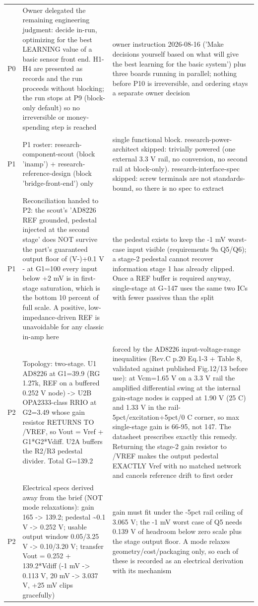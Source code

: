 \documentclass[11pt,a4paper]{article}
\begin{document}
{\begin{longtable}{lp{5.2cm}p{7.2cm}}
P0 & Owner delegated the remaining engineering judgment: decide in-run, optimizing for the best LEARNING value of a basic sensor front end. H1-H4 are presented as records and the run proceeds without blocking; the run stops at P9 (block-only default) so no irreversible or money-spending step is reached & owner instruction 2026-08-16 ('Make decisions yourself based on what will give the best learning for the basic system') plus three boards running in parallel; nothing before P10 is irreversible, and ordering stays a separate owner decision \\
P1 & P1 roster: research-component-scout (block 'inamp') + research-reference-design (block 'bridge-front-end') only & single functional block. research-power-architect skipped: trivially powered (one external 3.3 V rail, no conversion, no second rail at block-only). research-interface-spec skipped: screw terminals are not standards-bound, so there is no spec to extract \\
P1 & Reconciliation handed to P2: the scout's 'AD8226 REF grounded, pedestal injected at the second stage' does NOT survive the part's guaranteed output floor of (V-)+0.1 V - at G1=100 every input below +2 mV is in first-stage saturation, which is the bottom 10 percent of full scale. A positive, low-impedance-driven REF is unavoidable for any classic in-amp here & the pedestal exists to keep the -1 mV worst-case input visible (requirements 9a Q5/Q6); a stage-2 pedestal cannot recover information stage 1 has already clipped. Once a REF buffer is required anyway, single-stage at G\textasciitilde{}147 uses the same two ICs with fewer passives than the split \\
P2 & Topology: two-stage. U1 AD8226 at G1=39.9 (RG 1.27k, REF on a buffered 0.252 V node) -\textgreater{} U2B OPA2333-class RRIO at G2=3.49 whose gain resistor RETURNS TO /VREF, so Vout = Vref + G1{*}G2{*}Vdiff. U2A buffers the R2/R3 pedestal divider. Total G=139.2 & forced by the AD8226 input-voltage-range inequalities (Rev.C p.20 Eq.1-3 + Table 8, validated against published Fig.12/13 before use): at Vcm=1.65 V on a 3.3 V rail the amplified differential swing at the internal gain-stage nodes is capped at 1.90 V (25 C) and 1.33 V in the rail-5pct/excitation+5pct/0 C corner, so max single-stage gain is 66-95, not 147. The datasheet prescribes exactly this remedy. Returning the stage-2 gain resistor to /VREF makes the output pedestal EXACTLY Vref with no matched network and cancels reference drift to first order \\
P2 & Electrical specs derived away from the brief (NOT mode relaxations): gain 165 -\textgreater{} 139.2; pedestal \textasciitilde{}0.1 V -\textgreater{} 0.252 V; usable output window 0.05/3.25 V -\textgreater{} 0.10/3.20 V; transfer Vout = 0.252 + 139.2{*}Vdiff (-1 mV -\textgreater{} 0.113 V, 20 mV -\textgreater{} 3.037 V, +25 mV clips gracefully) & gain must fit under the -5pct rail ceiling of 3.065 V; the -1 mV worst case of Q5 needs 0.139 V of headroom below zero scale plus the stage output floor. A mode relaxes geometry/cost/packaging only, so each of these is recorded as an electrical derivation with its mechanism \\

\end{longtable}}
\end{document}
